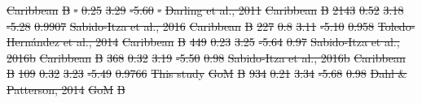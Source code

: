 \documentclass[fleqn,10pt,lineno]{wlpeerj} %
\providecommand{\DIFdel}[1]{{\protect\color{red}\sout{#1}}}                      %
\providecommand{\DIFdelFL}[1]{\DIFdel{#1}} %
\begin{document}
\DIFdelFL{Caribbean }%
\DIFdelFL{B }%
\DIFdelFL{- }%
\DIFdelFL{0.25 }%
\DIFdelFL{3.29 }%
\DIFdelFL{-5.60 }%
\DIFdelFL{- }%
\DIFdelFL{Darling et al., 2011}%
\DIFdelFL{Caribbean }%
\DIFdelFL{B }%
\DIFdelFL{2143 }%
\DIFdelFL{0.52 }%
\DIFdelFL{3.18 }%
\DIFdelFL{-5.28 }%
\DIFdelFL{0.9907 }%
\DIFdelFL{Sabido-Itza et al., 2016}%
\DIFdelFL{Caribbean }%
\DIFdelFL{B }%
\DIFdelFL{227 }%
\DIFdelFL{0.8 }%
\DIFdelFL{3.11 }%
\DIFdelFL{-5.10 }%
\DIFdelFL{0.958 }%
\DIFdelFL{Toledo-Hernández et al., 2014}%
\DIFdelFL{Caribbean }%
\DIFdelFL{B }%
\DIFdelFL{449 }%
\DIFdelFL{0.23 }%
\DIFdelFL{3.25 }%
\DIFdelFL{-5.64 }%
\DIFdelFL{0.97 }%
\DIFdelFL{Sabido-Itza et al., 2016b}%
\DIFdelFL{Caribbean }%
\DIFdelFL{B }%
\DIFdelFL{368 }%
\DIFdelFL{0.32 }%
\DIFdelFL{3.19 }%
\DIFdelFL{-5.50 }%
\DIFdelFL{0.98 }%
\DIFdelFL{Sabido-Itza et al., 2016b}%
\DIFdelFL{Caribbean }%
\DIFdelFL{B }%
\DIFdelFL{109 }%
\DIFdelFL{0.32 }%
\DIFdelFL{3.23 }%
\DIFdelFL{-5.49 }%
\DIFdelFL{0.9766 }%
\DIFdelFL{This study}%
\DIFdelFL{GoM }%
\DIFdelFL{B }%
\DIFdelFL{934 }%
\DIFdelFL{0.21 }%
\DIFdelFL{3.34 }%
\DIFdelFL{-5.68 }%
\DIFdelFL{0.98 }%
\DIFdelFL{Dahl \& Patterson, 2014}%
\DIFdelFL{GoM }%
\DIFdelFL{B }%
\end{document}
